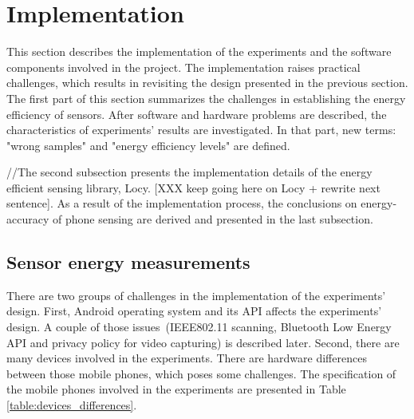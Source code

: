 \section{Implementation}
\label{s:implementation}
\hspace{10pt} This section describes the implementation of the experiments and the software components involved in the project. The implementation raises practical challenges, which results in revisiting the design presented in the previous section. The first part of this section summarizes the challenges in establishing the energy efficiency of sensors. After software and hardware problems are described, the characteristics of experiments' results are investigated. In that part, new terms: "wrong samples" and "energy efficiency levels" are defined. 


//The second subsection presents the implementation details of the energy efficient sensing library, Locy. [XXX keep going here on Locy + rewrite next sentence]. As a result of the implementation process, the conclusions on energy-accuracy of phone sensing are derived and presented in the last subsection.

\subsection{Sensor energy measurements}
There are two groups of challenges in the implementation of the experiments' design. First, Android operating system and its API affects the experiments' design. A couple of those issues\ (IEEE802.11 scanning, Bluetooth Low Energy API and privacy policy for video capturing) is described later. Second, there are many devices involved in the experiments. There are hardware differences between those mobile phones, which poses some challenges. The specification of the mobile phones involved in the experiments are presented in Table \ref{table:devices_differences}.
	
